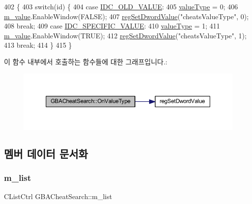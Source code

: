 \begin{DoxyCode}
402 \{
403   \textcolor{keywordflow}{switch}(\textcolor{keywordtype}{id}) \{
404   \textcolor{keywordflow}{case} \mbox{\hyperlink{resource_8h_a82e2e020fb1d5c999e3ffdd35e74dec7}{IDC\_OLD\_VALUE}}:
405     \mbox{\hyperlink{class_g_b_a_cheat_search_a633f5b523a814d3f1e4cb06b1799b798}{valueType}} = 0;
406     \mbox{\hyperlink{class_g_b_a_cheat_search_aaff3a33037e3561aadfdfe905c66148f}{m\_value}}.EnableWindow(FALSE);
407     \mbox{\hyperlink{_reg_8cpp_a758e775489a3fb5c3cc7071fdd5af87e}{regSetDwordValue}}(\textcolor{stringliteral}{"cheatsValueType"}, 0);
408     \textcolor{keywordflow}{break};
409   \textcolor{keywordflow}{case} \mbox{\hyperlink{resource_8h_aa1efc15f5ddbd77b1cc05bfb756a3567}{IDC\_SPECIFIC\_VALUE}}:
410     \mbox{\hyperlink{class_g_b_a_cheat_search_a633f5b523a814d3f1e4cb06b1799b798}{valueType}} = 1;
411     \mbox{\hyperlink{class_g_b_a_cheat_search_aaff3a33037e3561aadfdfe905c66148f}{m\_value}}.EnableWindow(TRUE);
412     \mbox{\hyperlink{_reg_8cpp_a758e775489a3fb5c3cc7071fdd5af87e}{regSetDwordValue}}(\textcolor{stringliteral}{"cheatsValueType"}, 1);     
413     \textcolor{keywordflow}{break};
414   \}
415 \}
\end{DoxyCode}
이 함수 내부에서 호출하는 함수들에 대한 그래프입니다.\+:
\nopagebreak
\begin{figure}[H]
\begin{center}
\leavevmode
\includegraphics[width=350pt]{class_g_b_a_cheat_search_a6cafcf45420b6af926e47a70f0f9da02_cgraph}
\end{center}
\end{figure}


\subsection{멤버 데이터 문서화}
\mbox{\label{class_g_b_a_cheat_search_aab4be5c0e3c3436c738a43f466be0902}} 
\subsubsection{\texorpdfstring{m\+\_\+list}{m\_list}}
{\footnotesize\ttfamily C\+List\+Ctrl G\+B\+A\+Cheat\+Search\+::m\+\_\+list}



